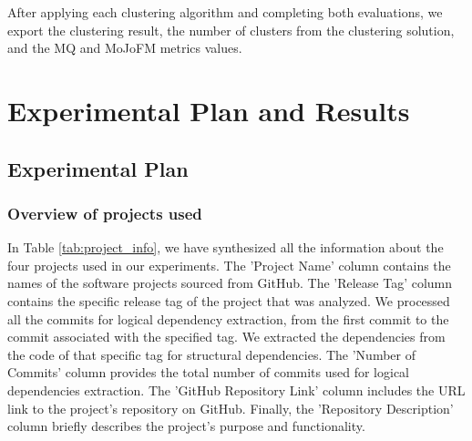 \documentclass[12pt, a4paper, twoside]{report}
\begin{document}
After applying each clustering algorithm and completing both evaluations, we export the clustering result, the number of clusters from the clustering solution, and the MQ and MoJoFM metrics values.



\section{Experimental Plan and Results}
\label{sec:experiment}


\subsection{Experimental Plan}
\label{subsec:plan}

\subsubsection{Overview of projects used}

\begin{table}[!h]
\renewcommand{\arraystretch}{1}
\centering
\caption{Overview of projects used in experimental analysis}
\label{tab:project_info}
\end{table}

In Table \ref{tab:project_info}, we have synthesized all the information about the four projects used in our experiments. The 'Project Name' column contains the names of the software projects sourced from GitHub. The 'Release Tag' column contains the specific release tag of the project that was analyzed. We processed all the commits for logical dependency extraction, from the first commit to the commit associated with the specified tag. We extracted the dependencies from the code of that specific tag for structural dependencies. The 'Number of Commits' column provides the total number of commits used for logical dependencies extraction. The 'GitHub Repository Link' column includes the URL link to the project's repository on GitHub. Finally, the 'Repository Description' column briefly describes the project's purpose and functionality.
\end{document}
